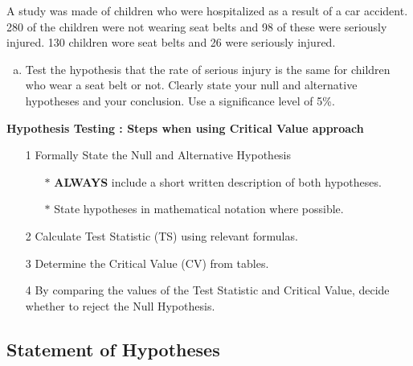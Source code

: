 \documentclass[a4paper,12pt]{article}
\begin{document}
\large 
\noindent  A study was made of children who were hospitalized as a result of a car accident. 280 of the children were not wearing seat belts and 98 of these were seriously injured. 130 children wore seat belts and 26 were seriously injured. 
\bigskip
\begin{enumerate}[(a)]
\item Test the hypothesis that the rate of serious injury is the same for children who wear a seat belt or not. Clearly state your null and alternative hypotheses and your conclusion. Use a significance level of 5\%.
\end{enumerate}
\bigskip

\begin{framed}
		\noindent \textbf{Hypothesis Testing : Steps when using Critical Value approach}
		
		\begin{itemize}
			\item[1] Formally State the Null and Alternative Hypothesis \smallskip
			{
				\begin{itemize}
					\item[$\ast$] \textbf{ALWAYS} include a short written description of both hypotheses.
					\item[$\ast$] State hypotheses in mathematical notation where possible.
					
				\end{itemize}
			}
			\item[2] Calculate Test Statistic (TS) using relevant formulas.\smallskip
			\item[3] Determine the Critical Value (CV) from tables. \smallskip
			\item[4] By comparing the values of the Test Statistic and Critical Value, decide whether to reject the Null Hypothesis.
		\end{itemize}
	\end{framed}

\newpage 
\subsection*{Statement of Hypotheses}
\end{document}
